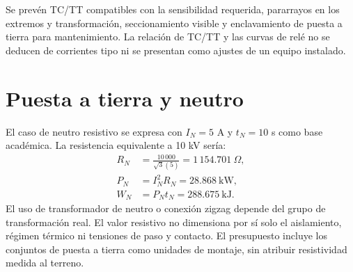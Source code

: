 Se prevén TC/TT compatibles con la sensibilidad requerida, pararrayos en los extremos y transformación, seccionamiento visible y enclavamiento de puesta a tierra para mantenimiento. La relación de TC/TT y las curvas de relé no se deducen de corrientes tipo ni se presentan como ajustes de un equipo instalado.
\section{Puesta a tierra y neutro}
El caso de neutro resistivo se expresa con $I_N=5$ A y $t_N=10$ s como base académica. La resistencia equivalente a 10 kV sería:
\begin{align}
R_N&=\frac{10\,000}{\sqrt{3}(5)}=1\,154.701\ \Omega,\\
P_N&=I_N^2R_N=28.868\ \mathrm{kW},\\
W_N&=P_Nt_N=288.675\ \mathrm{kJ}.
\end{align}
El uso de transformador de neutro o conexión zigzag depende del grupo de transformación real. El valor resistivo no dimensiona por sí solo el aislamiento, régimen térmico ni tensiones de paso y contacto. El presupuesto incluye los conjuntos de puesta a tierra como unidades de montaje, sin atribuir resistividad medida al terreno.
